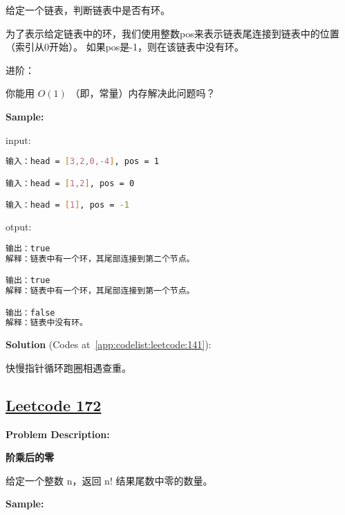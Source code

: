 给定一个链表，判断链表中是否有环。\par

为了表示给定链表中的环，我们使用整数pos来表示链表尾连接到链表中的位置（索引从0开始）。
如果pos是-1，则在该链表中没有环。\par

进阶：\par

你能用 $ O(1) $ （即，常量）内存解决此问题吗？\par


\textbf{Sample:}\par

input:\par

\begin{lstlisting}[language=bash]
输入：head = [3,2,0,-4], pos = 1

输入：head = [1,2], pos = 0

输入：head = [1], pos = -1
\end{lstlisting}

otput:\par

\begin{lstlisting}[language=bash]
输出：true
解释：链表中有一个环，其尾部连接到第二个节点。

输出：true
解释：链表中有一个环，其尾部连接到第一个节点。

输出：false
解释：链表中没有环。
\end{lstlisting}

\textbf{Solution }(Codes at~\ref{app:codelist:leetcode:141}):\par

快慢指针循环跑圈相遇查重。\par



\subsection{\href{https://leetcode-cn.com/}{Leetcode 172}}\label{app:problemlist:leetcode:172}

\textbf{Problem Description:}\par

\textbf{阶乘后的零}\par

给定一个整数 n，返回 n! 结果尾数中零的数量。\par


\textbf{Sample:}\par

